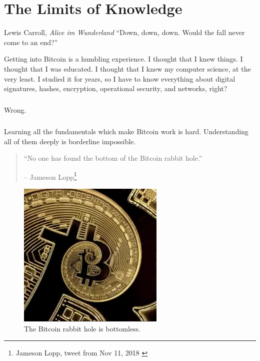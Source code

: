 \chapter{The Limits of Knowledge}
\label{les:7}

\begin{chapquote}{Lewis Carroll, \textit{Alice im Wunderland}}
\enquote{Down, down, down. Would the fall never come to an end?}
\end{chapquote}

Getting into Bitcoin is a humbling experience. I thought that I knew
things. I thought that I was educated. I thought that I knew my computer
science, at the very least. I studied it for years, so I have to know
everything about digital signatures, hashes, encryption, operational
security, and networks, right?

\paragraph{}
Wrong.

\paragraph{}
Learning all the fundamentals which make Bitcoin work is hard.
Understanding all of them deeply is borderline impossible.

\begin{quotation}\begin{samepage}
\enquote{No one has found the bottom of the Bitcoin rabbit hole.}
\begin{flushright} -- Jameson Lopp\footnote{Jameson Lopp, tweet from Nov 11, 2018 \cite{lopp-tweet}}
\end{flushright}\end{samepage}\end{quotation}

\begin{figure}
  \centering
  \includegraphics[width=7cm]{assets/images/rabbit-hole-bottomless.png}
  \caption{The Bitcoin rabbit hole is bottomless.}
  \label{fig:rabbit-hole-bottomless}
\end{figure}

